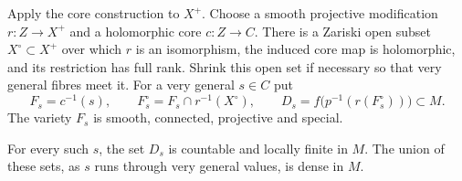 Apply the core construction to $X^+$.  Choose a smooth projective
modification $r:Z\to X^+$ and a holomorphic core $c:Z\to C$.  There is
a Zariski open subset $X^\circ\subset X^+$ over which $r$ is an
isomorphism, the induced core map is holomorphic, and its restriction
has full rank.  Shrink this open set if necessary so that very general
fibres meet it.  For a very general $s\in C$ put
\[
 F_s=c^{-1}(s),\qquad
 F_s^\circ=F_s\cap r^{-1}(X^\circ),\qquad
 D_s=f\bigl(p^{-1}(r(F_s^\circ))\bigr)\subset M.
\]
The variety $F_s$ is smooth, connected, projective and special.

\begin{lemma}\label{grp:countable-core-level}
For every such $s$, the set $D_s$ is countable and locally finite in $M$.
The union of these sets, as $s$ runs through very general values, is
dense in $M$.
\end{lemma}


